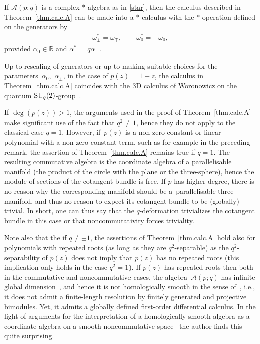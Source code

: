 \documentclass[10pt,a4paper]{amsart}
\numberwithin{equation}{section}
\def\AWeyl#1#2{{\mathcal{A}}(#1;#2)}
\begin{document}
\begin{Remark}\label{rem.star}
If $\AWeyl p q$ is a complex $*$-algebra as in \eqref{star}, then the calculus described in Theorem~\ref{thm.calc.A} can be made into a $*$-calculus with the $*$-operation def\/ined on the generators by
\begin{gather*}
\omega^*_{\pm} = \omega_\mp, \qquad \omega_0^* = - \omega_0,
\end{gather*}
provided $\alpha_0 \in {\mathbb R}$ and $\alpha_-^* = q\alpha_+$.
\end{Remark}
\begin{Remark}\label{3d.wor}
Up to rescaling of generators or up to making suitable choices for the parame\-ters~$\alpha_0$,~$\alpha_\pm$, in the case of $p(z)=1-z$, the calculus in Theorem~\ref{thm.calc.A} coincides with the 3D calculus of Woronowicz on the quantum ${\rm SU}_q(2)$-group~\cite{Wor:twi}.
\end{Remark}

\begin{Remark}\label{rem.classical}
If $\deg(p(z))>1$, the arguments used in the proof of Theorem~\ref{thm.calc.A} make signif\/icant use of the fact that $q^2\neq 1$, hence they do not apply to the classical case $q=1$. However, if~$p(z)$ is a non-zero constant or linear polynomial with a non-zero constant term, such as for example in the preceding remark, the assertion of Theorem~\ref{thm.calc.A} remains true if $q=1$. The resulting commutative algebra is the coordinate algebra of a parallelisable manifold (the product of the circle with the plane or the three-sphere), hence the module of sections of the cotangent bundle is free. If $p$ has higher degree, there is no reason why the corresponding manifold should be a~parallelisable three-manifold, and thus no reason to expect its cotangent bundle to be (globally) trivial. In short, one can thus say that the $q$-deformation trivializes the cotangent bundle in this case or that noncommutativity forces triviality.

Note also that the if $q\neq \pm 1$, the assertions of Theorem~\ref{thm.calc.A} hold also for polynomials with repeated roots (as long as they are $q^2$-separable) as the $q^2$-separability of $p(z)$ does not imply that $p(z)$ has no repeated roots (this implication only holds in the case $q^2=1$). If $p(z)$ has repeated roots then both in the commutative and noncommutative cases, the algebra~$\AWeyl p q $ has inf\/inite global dimension~\cite{Bav:gweyl}, and hence it is not homologically smooth in the sense of~\cite{Van:rel}, i.e., it does not admit a f\/inite-length resolution by f\/initely generated and projective bimodules. Yet, it admits a globally def\/ined f\/irst-order dif\/ferential calculus. In the light of arguments for the interpretation of a homologically smooth algebra as a coordinate algebra on a smooth noncommutative space~\cite{Kra:Hoc} the author f\/inds this quite surprising.
\end{Remark}
\end{document}

